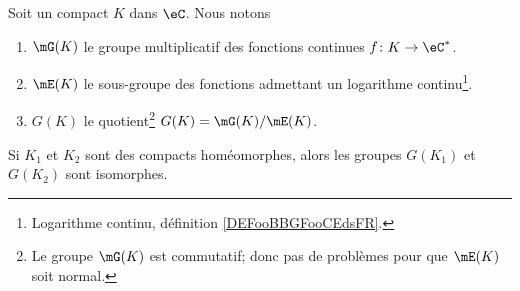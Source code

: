 \begin{definition}        \label{DEFooURFMooXIaRkl}
	Soit un compact \( K\) dans \( \eC\). Nous notons
	\begin{enumerate}
		\item
		      \( \mG(K)\) le groupe multiplicatif des fonctions continues \( f\colon K\to \eC^*\).
		\item
		      \( \mE(K)\) le sous-groupe des fonctions admettant un logarithme continu\footnote{Logarithme continu, définition \ref{DEFooBBGFooCEdsFR}.}.
		\item
		      \( G(K)\) le quotient\footnote{Le groupe \( \mG(K)\) est commutatif; donc pas de problèmes pour que \( \mE(K)\) soit normal.} \( G(K)=\mG(K)/\mE(K)\).
	\end{enumerate}
\end{definition}

\begin{lemma}     \label{LEMooHEOWooHTtHsJ}
	Si \( K_1\) et \( K_2\) sont des compacts homéomorphes, alors les groupes \( G(K_1)\) et \( G(K_2)\) sont isomorphes.
\end{lemma}

